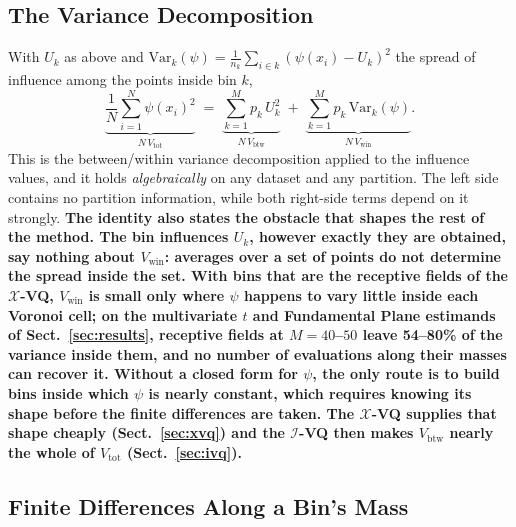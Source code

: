 \documentclass[runningheads]{llncs}
\newif\ifrev \revtrue
\newcommand{\rev}[1]{\ifrev{\color{blue}\bfseries #1}\else#1\fi}
\newcommand{\ifl}{\psi}
\newcommand{\Vcell}{V_{\mathrm{btw}}}
\newcommand{\Vwithin}{V_{\mathrm{win}}}
\newcommand{\Vtotal}{V_{\mathrm{tot}}}
\newcommand{\XVQ}{\ensuremath{\mathcal{X}}-VQ}
\newcommand{\IVQ}{\ensuremath{\mathcal{I}}-VQ}
\begin{document}
\subsection{The Variance Decomposition}\label{sec:identity}

With $U_k$ as above and $\mathrm{Var}_k(\ifl) = \tfrac{1}{n_k}\sum_{i \in k}(\ifl(x_i) - U_k)^2$ the spread of influence among the points inside bin $k$,
\begin{equation}\label{eq:identity}
\underbrace{\frac1N\sum_{i=1}^{N} \ifl(x_i)^{2}}_{N\,\Vtotal}
\;=\;
\underbrace{\sum_{k=1}^{M} p_k\, U_k^{2}}_{N\,\Vcell}
\;+\;
\underbrace{\sum_{k=1}^{M} p_k\, \mathrm{Var}_k(\ifl)}_{N\,\Vwithin}.
\end{equation}
This is the between/within variance decomposition applied to the influence values, and it holds \emph{algebraically} on any dataset and any partition. The left side contains no partition information, while both right-side terms depend on it strongly. \rev{The identity also states the obstacle that shapes the rest of the method. The bin influences $U_k$, however exactly they are obtained, say nothing about $\Vwithin$: averages over a set of points do not determine the spread inside the set. With bins that are the receptive fields of the \XVQ, $\Vwithin$ is small only where $\psi$ happens to vary little inside each Voronoi cell; on the multivariate $t$ and Fundamental Plane estimands of Sect.~\ref{sec:results}, receptive fields at $M = 40$--$50$ leave 54--80\% of the variance inside them, and no number of evaluations along their masses can recover it. Without a closed form for $\psi$, the only route is to build bins inside which $\psi$ is nearly constant, which requires knowing its shape before the finite differences are taken. The \XVQ{} supplies that shape cheaply (Sect.~\ref{sec:xvq}) and the \IVQ{} then makes $\Vcell$ nearly the whole of $\Vtotal$ (Sect.~\ref{sec:ivq}).}

\subsection{Finite Differences Along a Bin's Mass}\label{sec:difference}
\end{document}
